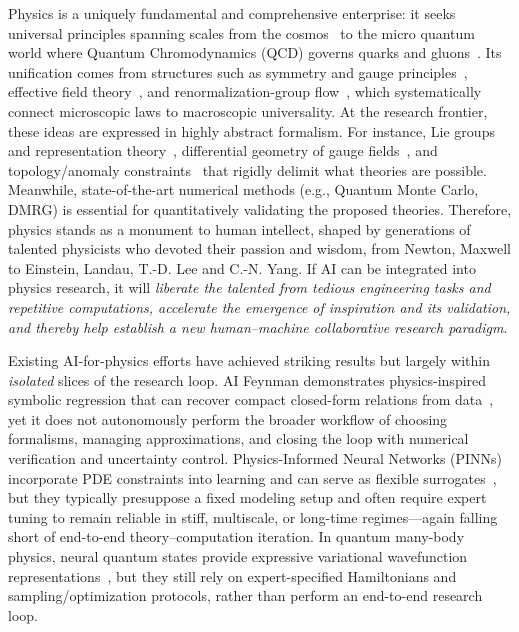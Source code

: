 \documentclass[11pt, a4paper, logo, copyright, nonumbering]{SAI}
\begin{document}
Physics is a uniquely fundamental and comprehensive enterprise: it seeks universal principles spanning scales from the 
cosmos~\citep{peebles2020principles} to the micro quantum world where Quantum Chromodynamics (QCD) governs quarks and gluons~\citep{marciano1978quantum}.
Its unification comes from structures such as symmetry and gauge principles~\citep{noether1983invariante,yang1954conservation}, effective field theory~\citep{weinberg1979phenomenological}, and renormalization-group flow~\citep{wilson1975renormalization}, which systematically connect microscopic laws to macroscopic universality.
At the research frontier, these ideas are expressed in highly abstract formalism. For instance, Lie groups and representation theory~\citep{georgi2000lie}, differential geometry of gauge fields~\citep{wu1975concept}, and topology/anomaly constraints~\citep{adler1969axial} that rigidly delimit what theories are possible.
Meanwhile, state-of-the-art numerical methods (e.g., Quantum Monte Carlo, DMRG) is essential for quantitatively validating the proposed theories.
Therefore, physics stands as a monument to human intellect, shaped by generations of talented physicists who devoted their passion and wisdom, from Newton, Maxwell to Einstein, Landau, T.-D. Lee and C.-N. Yang. 
If AI can be integrated into physics research, it will \emph{liberate the talented from tedious engineering tasks and repetitive computations, accelerate the emergence of inspiration and its validation, and thereby help establish a new human–machine collaborative research paradigm}.

\vspace{-0.2ex}

Existing AI-for-physics efforts have achieved striking results but largely within \emph{isolated} slices of the research loop.
AI Feynman demonstrates physics-inspired symbolic regression that can recover compact closed-form relations from data~\cite{udrescu2020aifeynman}, yet it does not autonomously perform the broader workflow of choosing formalisms, managing approximations, and closing the loop with numerical verification and uncertainty control.
Physics-Informed Neural Networks (PINNs) incorporate PDE constraints into learning and can serve as flexible surrogates~\cite{raissi2019pinn}, but they typically presuppose a fixed modeling setup and often require expert tuning to remain reliable in stiff, multiscale, or long-time regimes---again falling short of end-to-end theory--computation iteration.
In quantum many-body physics, neural quantum states provide expressive variational wavefunction representations~\cite{carleo2017nqs}, but they still rely on expert-specified Hamiltonians and sampling/optimization protocols, rather than perform an end-to-end research loop.
\end{document}
